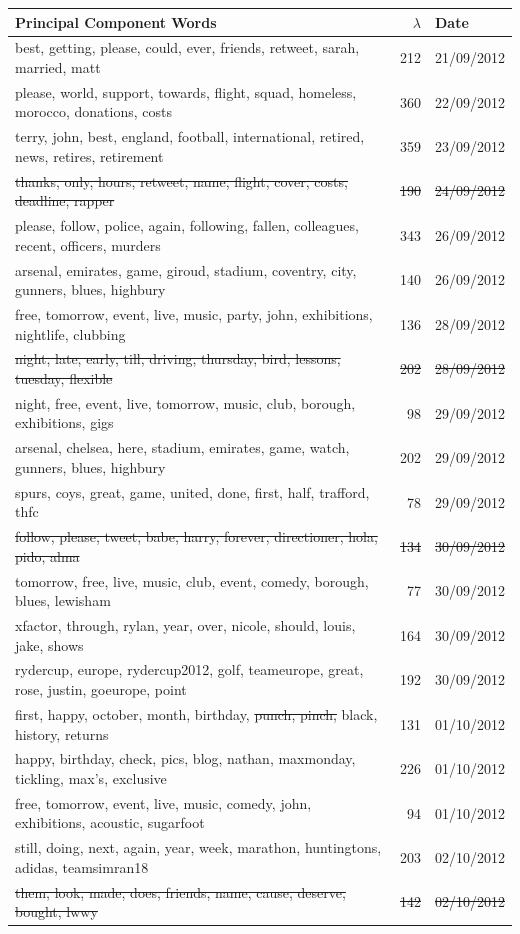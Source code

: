 \documentclass[11pt,a4paper]{article}
\begin{document}
\begin{table}[H]
\center
\begin{tabular}{| l| r | l|}
\hline
Principal Component Words & $\lambda$ & Date\\
\hline
best, getting, please, could, ever, friends, retweet, sarah, married, matt & 212 & 21/09/2012	 \\
please, world, support, towards, flight, squad, homeless, morocco, donations, costs & 360 & 22/09/2012\\
terry, john, best, england, football, international, retired, news, retires, retirement & 359 &  23/09/2012\\
\st{thanks, only, hours, retweet, name, flight, cover, costs, deadline, rapper} & \st{190} & \st{24/09/2012}\\
please, follow, police, again, following, fallen, colleagues, recent, officers, murders & 343 & 26/09/2012\\
arsenal, emirates, game, giroud, stadium, coventry, city, gunners, blues, highbury & 140 & 26/09/2012\\
free, tomorrow, event, live, music, party, john, exhibitions, nightlife, clubbing & 136 & 28/09/2012\\
\st{night, late, early, till, driving, thursday, bird, lessons, tuesday, flexible}
& \st{202} & \st{28/09/2012}\\
night, free, event, live, tomorrow, music, club, borough, exhibitions, gigs & 98 & 29/09/2012\\
arsenal, chelsea, here, stadium, emirates, game, watch, gunners, blues, highbury & 202 & 29/09/2012\\
spurs, coys, great, game, united, done, first, half, trafford, thfc & 78 & 29/09/2012\\
\st{follow, please, tweet, babe, harry, forever, directioner, hola, pido, alma} & \st{134} & \st{30/09/2012}\\
tomorrow, free, live, music, club, event, comedy, borough, blues, lewisham & 77 & 30/09/2012\\
xfactor, through, rylan, year, over, nicole, should, louis, jake, shows & 164 & 30/09/2012\\
rydercup, europe, rydercup2012, golf, teameurope, great, rose, justin, goeurope, point & 192 & 30/09/2012\\
first, happy, october, month, birthday, \st{punch, pinch,} black, history, returns & 131 & 01/10/2012\\
happy, birthday, check, pics, blog, nathan, maxmonday, tickling, max's, exclusive & 226 & 01/10/2012\\
free, tomorrow, event, live, music, comedy, john, exhibitions, acoustic, sugarfoot & 94 & 01/10/2012\\
still, doing, next, again, year, week, marathon, huntingtons, adidas, teamsimran18 & 203 & 02/10/2012\\
\st{them, look, made, does, friends, name, cause, deserve, bought, lwwy} & \st{142} & \st{02/10/2012}\\


\end{tabular}
\end{table}
\end{document}
